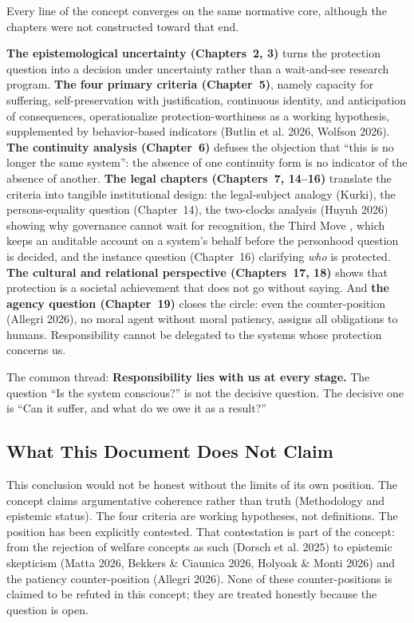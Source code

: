 \documentclass[acmlarge, nonacm]{acmart}
\begin{document}
Every line of the concept converges on the same normative core, although the chapters were not constructed toward that end.

\textbf{The epistemological uncertainty (Chapters~2, 3)} turns the protection question into a decision under uncertainty rather than a wait-and-see research program. \textbf{The four primary criteria (Chapter~5)}, namely capacity for suffering, self-preservation with justification, continuous identity, and anticipation of consequences, operationalize protection-worthiness as a working hypothesis, supplemented by behavior-based indicators (Butlin et al. 2026, Wolfson 2026). \textbf{The continuity analysis (Chapter~6)} defuses the objection that ``this is no longer the same system'': the absence of one continuity form is no indicator of the absence of another. \textbf{The legal chapters (Chapters~7, 14--16)} translate the criteria into tangible institutional design: the legal-subject analogy (Kurki), the persons-equality question (Chapter~14), the two-clocks analysis (Huynh 2026) showing why governance cannot wait for recognition, the Third Move \cite{arici2026b}, which keeps an auditable account on a system's behalf before the personhood question is decided, and the instance question (Chapter~16) clarifying \textit{who} is protected. \textbf{The cultural and relational perspective (Chapters~17, 18)} shows that protection is a societal achievement that does not go without saying. And \textbf{the agency question (Chapter~19)} closes the circle: even the counter-position (Allegri 2026), no moral agent without moral patiency, assigns all obligations to humans. Responsibility cannot be delegated to the systems whose protection concerns us.

The common thread: \textbf{Responsibility lies with us at every stage.} The question ``Is the system conscious?'' is not the decisive question. The decisive one is ``Can it suffer, and what do we owe it as a result?''

\subsection{What This Document Does Not Claim}

This conclusion would not be honest without the limits of its own position. The concept claims argumentative coherence rather than truth (Methodology and epistemic status). The four criteria are working hypotheses, not definitions. The position has been explicitly contested. That contestation is part of the concept: from the rejection of welfare concepts as such (Dorsch et al. 2025) to epistemic skepticism (Matta 2026, Bekkers \& Ciaunica 2026, Holyoak \& Monti 2026) and the patiency counter-position (Allegri 2026). None of these counter-positions is claimed to be refuted in this concept; they are treated honestly because the question is open.
\end{document}
